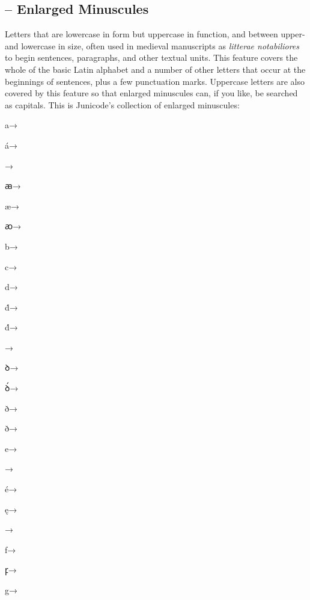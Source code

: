 \subsection{ –
Enlarged Minuscules}\hypertarget{ss06}{}
Letters that are lowercase in form but uppercase in function, and between upper- and
lowercase in size, often used in medieval manuscripts as \textit{litterae notabiliores} to begin sentences,
paragraphs, and other textual units.
This feature
covers the whole of the basic Latin alphabet and a number of other letters that
occur at the beginnings of sentences, plus a few punctuation marks.
Uppercase letters are also covered by this feature so that enlarged minuscules
can, if you like, be searched as capitals. This is Junicode's collection of
enlarged minuscules:

\begin{multicols}{6}
\color{BrickRed}a\hfill→\hfill{}

á\hfill→\hfill{}

\hfill→\hfill{}

ꜳ\hfill→\hfill{}

æ\hfill→\hfill{}

ꜵ\hfill→\hfill{}

b\hfill→\hfill{}

c\hfill→\hfill{}

d\hfill→\hfill{}

ḋ\hfill→\hfill{}

d́\hfill→\hfill{}

\hfill→\hfill{}

ꝺ\hfill→\hfill{}

ꝺ́\hfill→\hfill{}

{ð\hfill→\hfill{}}

ð\hfill→\hfill{}

e\hfill→\hfill{}

\hfill→\hfill{}

é\hfill→\hfill{}

ę\hfill→\hfill{}

\hfill→\hfill{}

f\hfill→\hfill{}

ꝼ\hfill→\hfill{}

g\hfill→\hfill{}


\end{multicols}
